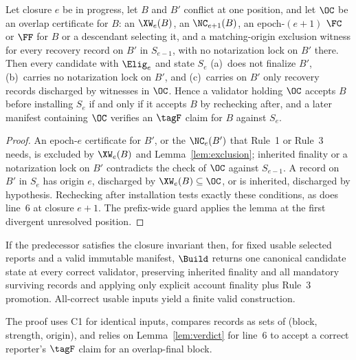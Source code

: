 \begin{lemma}
\label{lem:verdict}
Let closure $e$ be in progress, let $B$ and $B'$ conflict at one position, and let $\OC$ be an overlap certificate for $B$: an $\XW_e(B)$, an $\NC_{e+1}(B)$, an epoch-$(e+1)$ $\FC$ or $\FF$ for $B$ or a descendant selecting it, and a matching-origin exclusion witness for every recovery record on $B'$ in $S_{e-1}$, with no notarization lock on $B'$ there. Then every candidate with $\Elig_e$ and state $S_e$ (a)~does not finalize $B'$, (b)~carries no notarization lock on $B'$, and (c)~carries on $B'$ only recovery records discharged by witnesses in $\OC$. Hence a validator holding $\OC$ accepts $B$ before installing $S_e$ if and only if it accepts $B$ by rechecking after, and a later manifest containing $\OC$ verifies an $\tagF$ claim for $B$ against $S_e$.
\end{lemma}
\begin{proof}
An epoch-$e$ certificate for $B'$, or the $\NC_e(B')$ that Rule~1 or Rule~3 needs, is excluded by $\XW_e(B)$ and Lemma~\ref{lem:exclusion}; inherited finality or a notarization lock on $B'$ contradicts the check of $\OC$ against $S_{e-1}$. A record on $B'$ in $S_e$ has origin $e$, discharged by $\XW_e(B)\subseteq\OC$, or is inherited, discharged by hypothesis. Rechecking after installation tests exactly these conditions, as does line~6 at closure $e+1$. The prefix-wide guard applies the lemma at the first divergent unresolved position.
\end{proof}

\begin{lemma}
\label{lem:construction}
If the predecessor satisfies the closure invariant then, for fixed usable selected reports and a valid immutable manifest, $\Build$ returns one canonical candidate state at every correct validator, preserving inherited finality and all mandatory surviving records and applying only explicit account finality plus Rule~3 promotion. All-correct usable inputs yield a finite valid construction.
\end{lemma}
The proof uses C1 for identical inputs, compares records as sets of (block, strength, origin), and relies on Lemma~\ref{lem:verdict} for line~6 to accept a correct reporter's $\tagF$ claim for an overlap-final block.

